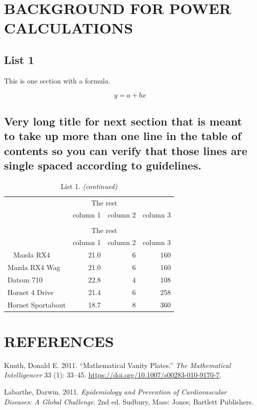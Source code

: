 \documentclass[12pt,report]{uncdissertation}
\begin{document}
\backmatter

\appendix

\chapter{\uppercase{Background for power calculations}}\label{app1}

\section{List 1}

This is one section with a formula.

\[ y = a + bx \]

\singlespace

\section{Very long title for next section that is meant to take up more than one line in the table of contents so you can verify that those lines are single spaced according to guidelines.}

\begin{longtable}{lrrr}
\caption{\label{tab:unnamed-chunk-13}List 1.}\\
\toprule
\multicolumn{1}{c}{ } & \multicolumn{2}{c}{The rest} \\
\cmidrule(l{3pt}r{3pt}){2-3}
  & column 1 & column 2 & column 3\\
\midrule
\endfirsthead
\caption[]{List 1. \textit{(continued)}}\\
\toprule
\multicolumn{1}{c}{ } & \multicolumn{2}{c}{The rest} \\
\cmidrule(l{3pt}r{3pt}){2-3}
  & column 1 & column 2 & column 3\\
\midrule
\endhead
\
\endfoot
\bottomrule
\endlastfoot
Mazda RX4 & 21.0 & 6 & 160\\
Mazda RX4 Wag & 21.0 & 6 & 160\\
Datsun 710 & 22.8 & 4 & 108\\
Hornet 4 Drive & 21.4 & 6 & 258\\
Hornet Sportabout & 18.7 & 8 & 360\\*
\end{longtable}

\chapter*{REFERENCES}
\printbibliography{}

\hypertarget{refs}{}
\leavevmode\hypertarget{ref-knuth_mathematical_2011}{}%
Knuth, Donald E. 2011. ``Mathematical Vanity Plates.'' \emph{The
Mathematical Intelligencer} 33 (1): 33--45.
\url{https://doi.org/10.1007/s00283-010-9170-7}.

\leavevmode\hypertarget{ref-labarthe_epidemiology_2011}{}%
Labarthe, Darwin. 2011. \emph{Epidemiology and Prevention of
Cardiovascular Diseases: A Global Challenge}. 2nd ed. Sudbury, Mass:
Jones; Bartlett Publishers.
\end{document}
